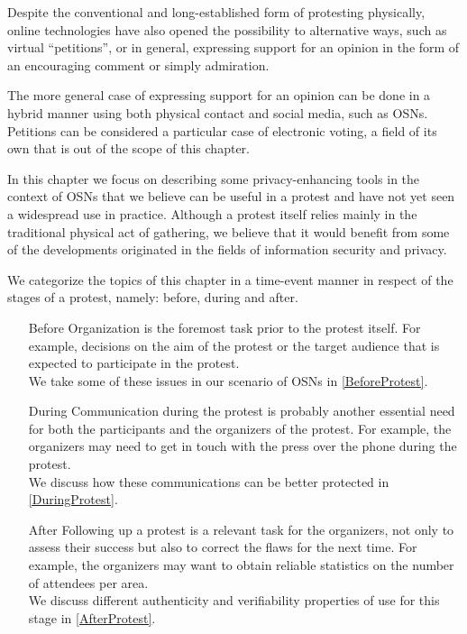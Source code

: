 Despite the conventional and long-established form of protesting physically, online 
technologies have also opened the possibility to alternative ways, such as virtual 
\enquote{petitions}, or in general, expressing support for an opinion in the form 
of an encouraging comment or simply admiration. 

The more general case of expressing support for an opinion can be done in a hybrid 
manner using both physical contact and social media, such as \acp{OSN}. Petitions 
can be considered a particular case of electronic voting, a field of its own that 
is out of the scope of this chapter. 

In this chapter we focus on describing some privacy-enhancing tools in the context 
of \acp{OSN} that we believe can be useful in a protest and have not yet seen a 
widespread use in practice. Although a protest itself relies mainly in the traditional 
physical act of gathering, we believe that it would benefit from some of the developments 
originated in the fields of information security and privacy.

We categorize the topics of this chapter in a time-event manner in respect of the 
stages of a protest, namely: before, during and after.
\begin{itemize}
    \item[Before] Organization is the foremost task prior to the protest itself. 
    For example, decisions on the aim of the protest or the target audience that 
    is expected to participate in the protest.\\
    We take some of these issues in our scenario of \acp{OSN} in \cref{BeforeProtest}.
    \item[During] Communication during the protest is probably another essential 
    need for both the participants and the organizers of the protest. For example, 
    the organizers may need to get in touch with the press over the phone during 
    the protest.\\
    We discuss how these communications can be better protected in \cref{DuringProtest}.
    \item[After] Following up a protest is a relevant task for the organizers, not 
    only to assess their success but also to correct the flaws for the next time. 
    For example, the organizers may want to obtain reliable statistics on the number 
    of attendees per area.\\
    We discuss different authenticity and verifiability properties of use for this 
    stage in \cref{AfterProtest}.
\end{itemize}

